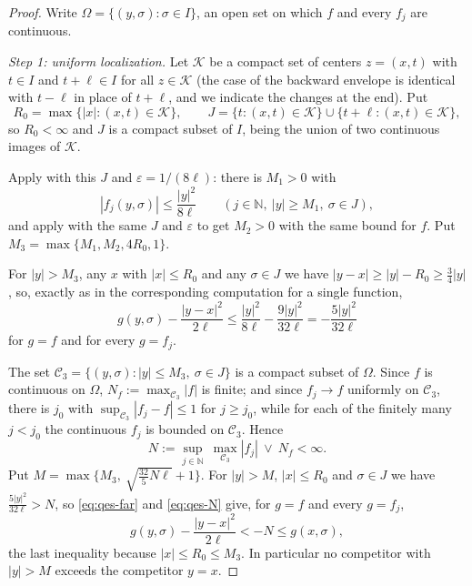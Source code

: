 \begin{proof}
Write $\Omega=\{(y,\sigma):\sigma\in I\}$, an open set on which $f$ and every
$f_j$ are continuous.

\emph{Step 1: uniform localization.}
Let $\mathcal K$ be a compact set of centers $z=(x,t)$ with $t\in I$ and
$t+\ell\in I$ for all $z\in\mathcal K$ (the case of the backward envelope is
identical with $t-\ell$ in place of $t+\ell$, and we indicate the changes at the
end). Put
\[
  R_0=\max\{|x|:(x,t)\in\mathcal K\},
  \qquad
  J=\{t:(x,t)\in\mathcal K\}\cup\{t+\ell:(x,t)\in\mathcal K\},
\]
so $R_0<\infty$ and $J$ is a compact subset of $I$, being the union of two
continuous images of $\mathcal K$.

Apply  with this $J$ and $\varepsilon=1/(8\ell)$:
there is $M_1>0$ with
\begin{equation}\label{eq:qes-growthj}
  |f_j(y,\sigma)|\le\frac{|y|^2}{8\ell}
  \qquad(j\in\mathbb N,\ |y|\ge M_1,\ \sigma\in J),
\end{equation}
and apply  with the same $J$ and $\varepsilon$ to get
$M_2>0$ with the same bound for $f$. Put
$M_3=\max\{M_1,M_2,4R_0,1\}$.

For $|y|>M_3$, any $x$ with $|x|\le R_0$ and any $\sigma\in J$ we have
$|y-x|\ge|y|-R_0\ge\tfrac34|y|$, so, exactly as in the corresponding
computation for a single function,
\begin{equation}\label{eq:qes-far}
  g(y,\sigma)-\frac{|y-x|^2}{2\ell}
   \le\frac{|y|^2}{8\ell}-\frac{9|y|^2}{32\ell}=-\frac{5|y|^2}{32\ell}
\end{equation}
for $g=f$ and for every $g=f_j$.

The set $\mathcal C_3=\{(y,\sigma):|y|\le M_3,\ \sigma\in J\}$ is a compact
subset of $\Omega$. Since $f$ is continuous on $\Omega$, $N_f:=\max_{\mathcal
C_3}|f|$ is finite; and since $f_j\to f$ uniformly on $\mathcal C_3$, there is
$j_0$ with $\sup_{\mathcal C_3}|f_j-f|\le1$ for $j\ge j_0$, while for each of
the finitely many $j<j_0$ the continuous $f_j$ is bounded on $\mathcal C_3$.
Hence
\begin{equation}\label{eq:qes-N}
  N:=\sup_{j\in\mathbb N}\ \max_{\mathcal C_3}|f_j|\ \vee\ N_f<\infty .
\end{equation}
Put $M=\max\bigl\{M_3,\ \sqrt{\tfrac{32}{5}N\ell}+1\bigr\}$. For $|y|>M$,
$|x|\le R_0$ and $\sigma\in J$ we have $\tfrac{5|y|^2}{32\ell}>N$, so
\eqref{eq:qes-far} and \eqref{eq:qes-N} give, for $g=f$ and every $g=f_j$,
\[
  g(y,\sigma)-\frac{|y-x|^2}{2\ell}<-N\le g(x,\sigma),
\]
the last inequality because $|x|\le R_0\le M_3$. In particular no competitor
with $|y|>M$ exceeds the competitor $y=x$.


\end{proof}
